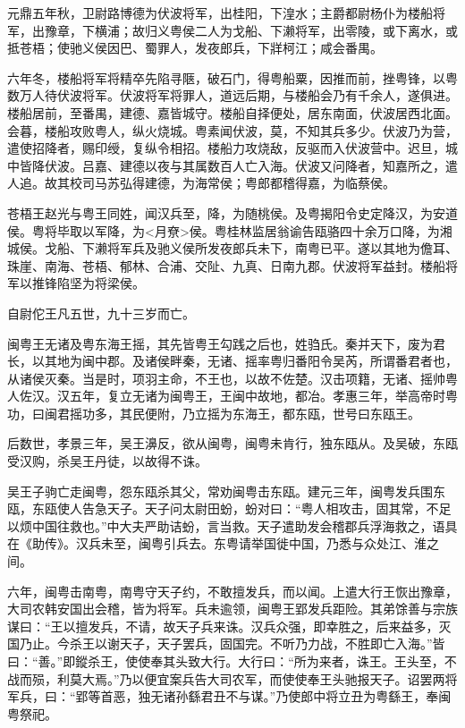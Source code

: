 \documentclass[]{article}
\begin{document}
元鼎五年秋，卫尉路博德为伏波将军，出桂阳，下湟水；主爵都尉杨仆为楼船将军，出豫章，下横浦；故归义粤侯二人为戈船、下濑将军，出零陵，或下离水，或抵苍梧；使驰义侯因巴、蜀罪人，发夜郎兵，下牂柯江；咸会番禺。

六年冬，楼船将军将精卒先陷寻陿，破石门，得粤船粟，因推而前，挫粤锋，以粤数万人待伏波将军。伏波将军将罪人，道远后期，与楼船会乃有千余人，遂俱进。楼船居前，至番禺，建德、嘉皆城守。楼船自择便处，居东南面，伏波居西北面。会暮，楼船攻败粤人，纵火烧城。粤素闻伏波，莫，不知其兵多少。伏波乃为营，遣使招降者，赐印绶，复纵令相招。楼船力攻烧敌，反驱而入伏波营中。迟旦，城中皆降伏波。吕嘉、建德以夜与其属数百人亡入海。伏波又问降者，知嘉所之，遣人追。故其校司马苏弘得建德，为海常侯；粤郎都稽得嘉，为临蔡侯。

苍梧王赵光与粤王同姓，闻汉兵至，降，为随桃侯。及粤揭阳令史定降汉，为安道侯。粤将毕取以军降，为\textless{}月尞\textgreater{}侯。粤桂林监居翁谕告瓯骆四十余万口降，为湘城侯。戈船、下濑将军兵及驰义侯所发夜郎兵未下，南粤已平。遂以其地为儋耳、珠崖、南海、苍梧、郁林、合浦、交阯、九真、日南九郡。伏波将军益封。楼船将军以推锋陷坚为将梁侯。

自尉佗王凡五世，九十三岁而亡。

闽粤王无诸及粤东海王摇，其先皆粤王勾践之后也，姓驺氏。秦并天下，废为君长，以其地为闽中郡。及诸侯畔秦，无诸、摇率粤归番阳令吴芮，所谓番君者也，从诸侯灭秦。当是时，项羽主命，不王也，以故不佐楚。汉击项籍，无诸、摇帅粤人佐汉。汉五年，复立无诸为闽粤王，王闽中故地，都冶。孝惠三年，举高帝时粤功，曰闽君摇功多，其民便附，乃立摇为东海王，都东瓯，世号曰东瓯王。

后数世，孝景三年，吴王濞反，欲从闽粤，闽粤未肯行，独东瓯从。及吴破，东瓯受汉购，杀吴王丹徒，以故得不诛。

吴王子驹亡走闽粤，怨东瓯杀其父，常劝闽粤击东瓯。建元三年，闽粤发兵围东瓯，东瓯使人告急天子。天子问太尉田蚡，蚡对曰：``粤人相攻击，固其常，不足以烦中国往救也。''中大夫严助诘蚡，言当救。天子遣助发会稽郡兵浮海救之，语具在《助传》。汉兵未至，闽粤引兵去。东粤请举国徙中国，乃悉与众处江、淮之间。

六年，闽粤击南粤，南粤守天子约，不敢擅发兵，而以闻。上遣大行王恢出豫章，大司农韩安国出会稽，皆为将军。兵未逾领，闽粤王郢发兵距险。其弟馀善与宗族谋曰：``王以擅发兵，不请，故天子兵来诛。汉兵众强，即幸胜之，后来益多，灭国乃止。今杀王以谢天子，天子罢兵，固国完。不听乃力战，不胜即亡入海。''皆曰：``善。''即鏦杀王，使使奉其头致大行。大行曰：``所为来者，诛王。王头至，不战而殒，利莫大焉。''乃以便宜案兵告大司农军，而使使奉王头驰报天子。诏罢两将军兵，曰：``郢等首恶，独无诸孙繇君丑不与谋。''乃使郎中将立丑为粤繇王，奉闽粤祭祀。
\end{document}
